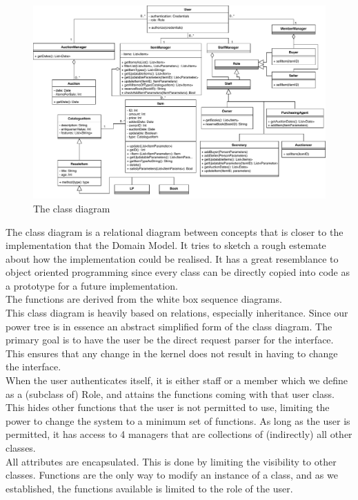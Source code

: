 \begin{landscape}
\begin{figure}[H]
	\centering
	\includegraphics[scale=.85]{uml/classdiagramUPD3.pdf}
	\caption*{The class diagram}
\end{figure}
\end{landscape}


The class diagram is a relational diagram between concepts that is closer to the implementation that the Domain Model. It tries to sketch a rough estemate about how the implementation could be realised. It has a great resemblance to object oriented programming since every class can be directly copied into code as a prototype for a future implementation.\\
The functions are derived from the white box sequence diagrams.\\
This class diagram is heavily based on relations, especially inheritance. Since our power tree is in essence an abstract simplified form of the class diagram. The primary goal is to have the user be the direct request parser for the interface. This ensures that any change in the kernel does not result in having to change the interface.\\
When the user authenticates itself, it is either staff or a member which we define as a (subclass of) Role, and attains the functions coming with that user class. This hides other functions that the user is not permitted to use, limiting the power to change the system to a minimum set of functions. As long as the user is permitted, it has access to 4 managers that are collections of (indirectly) all other classes.\\
All attributes are encapsulated. This is done by limiting the visibility to other classes. Functions are the only way to modify an instance of a class, and as we established, the functions available is limited to the role of the user.\\

